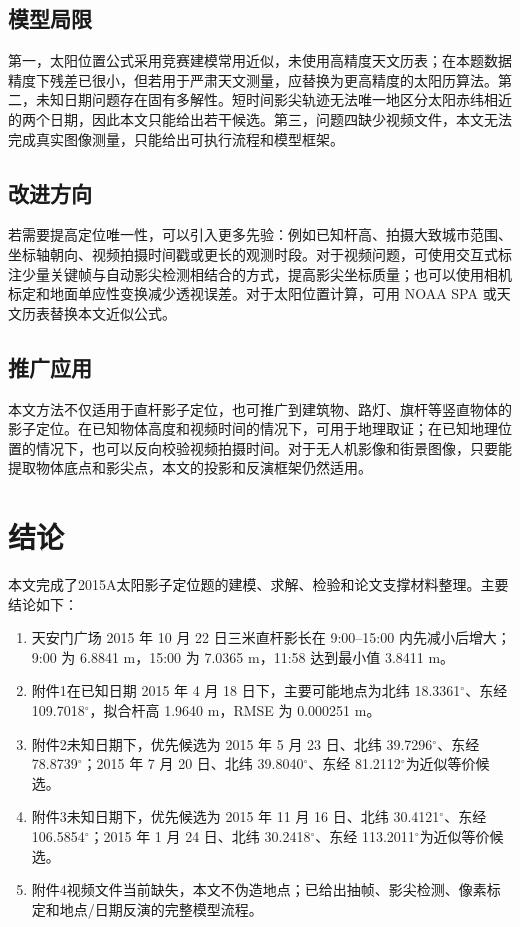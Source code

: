 \documentclass[UTF8,a4paper,12pt]{ctexart}
\begin{document}
\subsection{模型局限}
第一，太阳位置公式采用竞赛建模常用近似，未使用高精度天文历表；在本题数据精度下残差已很小，但若用于严肃天文测量，应替换为更高精度的太阳历算法。第二，未知日期问题存在固有多解性。短时间影尖轨迹无法唯一地区分太阳赤纬相近的两个日期，因此本文只能给出若干候选。第三，问题四缺少视频文件，本文无法完成真实图像测量，只能给出可执行流程和模型框架。

\subsection{改进方向}
若需要提高定位唯一性，可以引入更多先验：例如已知杆高、拍摄大致城市范围、坐标轴朝向、视频拍摄时间戳或更长的观测时段。对于视频问题，可使用交互式标注少量关键帧与自动影尖检测相结合的方式，提高影尖坐标质量；也可以使用相机标定和地面单应性变换减少透视误差。对于太阳位置计算，可用 NOAA SPA 或天文历表替换本文近似公式。

\subsection{推广应用}
本文方法不仅适用于直杆影子定位，也可推广到建筑物、路灯、旗杆等竖直物体的影子定位。在已知物体高度和视频时间的情况下，可用于地理取证；在已知地理位置的情况下，也可以反向校验视频拍摄时间。对于无人机影像和街景图像，只要能提取物体底点和影尖点，本文的投影和反演框架仍然适用。

\section{结论}
本文完成了2015A太阳影子定位题的建模、求解、检验和论文支撑材料整理。主要结论如下：
\begin{enumerate}
  \item 天安门广场 2015 年 10 月 22 日三米直杆影长在 9:00--15:00 内先减小后增大；9:00 为 6.8841 m，15:00 为 7.0365 m，11:58 达到最小值 3.8411 m。
  \item 附件1在已知日期 2015 年 4 月 18 日下，主要可能地点为北纬 18.3361$^\circ$、东经 109.7018$^\circ$，拟合杆高 1.9640 m，RMSE 为 0.000251 m。
  \item 附件2未知日期下，优先候选为 2015 年 5 月 23 日、北纬 39.7296$^\circ$、东经 78.8739$^\circ$；2015 年 7 月 20 日、北纬 39.8040$^\circ$、东经 81.2112$^\circ$为近似等价候选。
  \item 附件3未知日期下，优先候选为 2015 年 11 月 16 日、北纬 30.4121$^\circ$、东经 106.5854$^\circ$；2015 年 1 月 24 日、北纬 30.2418$^\circ$、东经 113.2011$^\circ$为近似等价候选。
  \item 附件4视频文件当前缺失，本文不伪造地点；已给出抽帧、影尖检测、像素标定和地点/日期反演的完整模型流程。
\end{enumerate}
\end{document}
